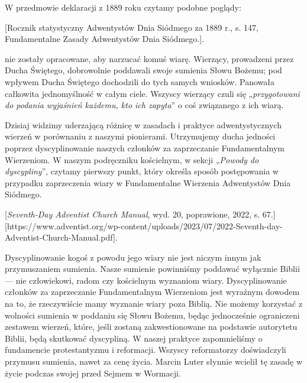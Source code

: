 W przedmowie deklaracji z 1889 roku czytamy podobne poglądy:

[Rocznik statystyczny Adwentystów Dnia Siódmego za 1889 r., s. 147, Fundamentalne Zasady Adwentystów Dnia Siódmego.].

 nie zostały opracowane, aby narzucać komuś wiarę. Wierzący, prowadzeni przez Ducha Świętego, dobrowolnie poddawali swoje sumienia Słowu Bożemu; pod wpływem Ducha Świętego dochodzili do tych samych wniosków. Panowała całkowita jednomyślność w całym ciele. Wszyscy wierzący czuli się „\textit{przygotowani do podania wyjaśnień każdemu, kto ich zapyta}” o coś związanego z ich wiarą.

Dzisiaj widzimy uderzającą różnicę w zasadach i praktyce adwentystycznych wierzeń w porównaniu z naszymi pionierami. Utrzymujemy ducha jedności poprzez dyscyplinowanie naszych członków za zaprzeczanie Fundamentalnym Wierzeniom. W naszym podręczniku kościelnym, w sekcji „\textit{Powody do dyscypliny}”, czytamy pierwszy punkt, który określa sposób postępowania w przypadku zaprzeczenia wiary w Fundamentalne Wierzenia Adwentystów Dnia Siódmego.


[\textit{Seventh-Day Adventist Church Manual}, wyd. 20, poprawione, 2022, s. 67.][https://www.adventist.org/wp-content/uploads/2023/07/2022-Seventh-day-Adventist-Church-Manual.pdf].

Dyscyplinowanie kogoś z powodu jego wiary nie jest niczym innym jak przymuszaniem sumienia. Nasze sumienie powinniśmy poddawać wyłącznie Biblii — nie człowiekowi, radom czy kościelnym wyznaniom wiary. Dyscyplinowanie członków za zaprzeczanie Fundamentalnym Wierzeniom jest wyraźnym dowodem na to, że rzeczywiście mamy wyznanie wiary poza Biblią. Nie możemy korzystać z wolności sumienia w poddaniu się Słowu Bożemu, będąc jednocześnie ograniczeni zestawem wierzeń, które, jeśli zostaną zakwestionowane na podstawie autorytetu Biblii, będą skutkować dyscypliną. W naszej praktyce zapomnieliśmy o fundamencie protestantyzmu i reformacji. Wszyscy reformatorzy doświadczyli przymusu sumienia, nawet za cenę życia. Marcin Luter słynnie wcielił tę zasadę w życie podczas swojej przed Sejmem w Wormacji.

